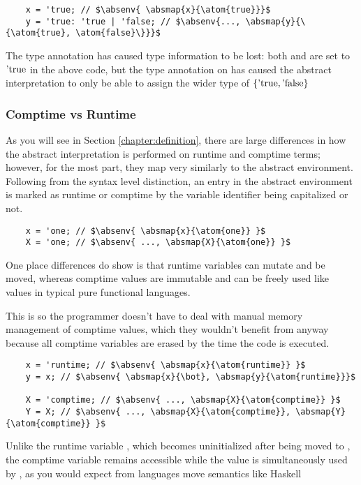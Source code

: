 \documentclass[12pt,twoside]{report}
\begin{document}
\begin{listing}[H]
  \begin{verbatim}
    x = 'true; // $\absenv{ \absmap{x}{\atom{true}}}$
    y = 'true: 'true | 'false; // $\absenv{..., \absmap{y}{\{\atom{true}, \atom{false}\}}}$
  \end{verbatim}
  \caption{The type annotation has caused type information to be lost: both  and  are set to $\atom{true}$ in the above code, but the type annotation on  has caused the abstract interpretation to only be able to assign the wider type of $\{ \atom{true}, \atom{false} \}$}
\end{listing}

\subsubsection{Comptime vs Runtime}
As you will see in Section \ref{chapter:definition}, there are large differences in how the abstract interpretation is performed on runtime and comptime terms; however, for the most part, they map very similarly to the abstract environment. Following from the syntax level distinction, an entry in the abstract environment is marked as runtime or comptime by the variable identifier being capitalized or not.

\begin{listing}[H]
  \begin{verbatim}
    x = 'one; // $\absenv{ \absmap{x}{\atom{one}} }$
    X = 'one; // $\absenv{ ..., \absmap{X}{\atom{one}} }$
  \end{verbatim}
\end{listing}

One place differences do show is that runtime variables can mutate and be moved, whereas comptime values are immutable and can be freely used like values in typical pure functional languages.

This is so the programmer doesn't have to deal with manual memory management of comptime values, which they wouldn't benefit from anyway because all comptime variables are erased by the time the code is executed.

\begin{listing}[H]
  \begin{verbatim}
    x = 'runtime; // $\absenv{ \absmap{x}{\atom{runtime}} }$
    y = x; // $\absenv{ \absmap{x}{\bot}, \absmap{y}{\atom{runtime}}}$
  
    X = 'comptime; // $\absenv{ ..., \absmap{X}{\atom{comptime}} }$
    Y = X; // $\absenv{ ..., \absmap{X}{\atom{comptime}}, \absmap{Y}{\atom{comptime}} }$
  \end{verbatim}
  \caption{Unlike the runtime variable , which becomes uninitialized after being moved to , the comptime variable  remains accessible while the value is simultaneously used by , as you would expect from languages move semantics like Haskell}
\end{listing}
\end{document}
